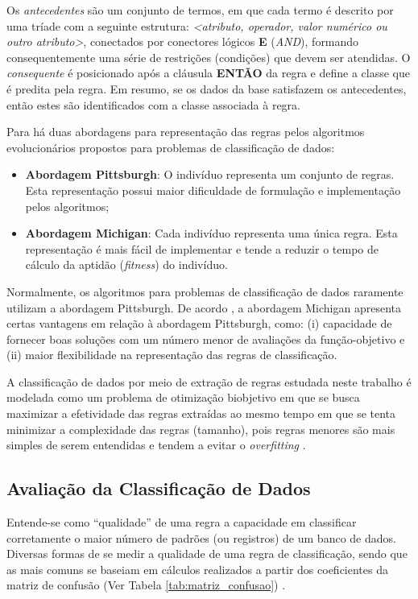 \documentclass[
	12pt,				%
	openany,			%
	oneside,	
	a4paper,			%
	brazil,				%
	]{unimontes-ppgmsc-abntex2}
\begin{document}
Os {\em antecedentes} são um conjunto de termos, em que cada termo é descrito por uma tríade com a seguinte estrutura: \textit{<atributo, operador, valor numérico ou outro atributo>}, conectados por conectores lógicos \textbf{E} ({\em AND}), formando consequentemente uma série de restrições (condições) que devem ser atendidas. O {\em consequente} é posicionado após a cláusula \textbf{ENTÃO} da regra e define a classe que é predita pela regra. Em resumo, se os dados da base satisfazem os antecedentes, então estes são identificados com a classe associada à regra.

Para  há duas abordagens para representação das regras pelos algoritmos evolucionários propostos para problemas de classificação de dados:
 
\begin{itemize}
\item \textbf{Abordagem Pittsburgh}: O indivíduo representa um conjunto de regras. Esta representação possui maior dificuldade de formulação e implementação pelos algoritmos;
\item \textbf{Abordagem Michigan}: Cada indivíduo representa uma única regra. Esta representação é mais fácil de implementar e tende a reduzir o tempo de cálculo da aptidão ({\em fitness}) do indivíduo.
\end{itemize}

Normalmente, os algoritmos para problemas de classificação de dados raramente utilizam a abordagem Pittsburgh. De acordo , a abordagem Michigan apresenta certas vantagens em relação à abordagem Pittsburgh, como: (i) capacidade de fornecer boas soluções com um número menor de avaliações da função-objetivo e (ii) maior flexibilidade na representação das regras de classificação.

A classificação de dados por meio de extração de regras estudada neste trabalho é modelada como um problema de otimização biobjetivo em que se busca maximizar a efetividade das regras extraídas ao mesmo tempo em que se tenta minimizar a complexidade das regras (tamanho), pois regras menores são mais simples de serem entendidas e tendem a evitar o {\em overfitting} \cite{Pereira_2012}.

\subsection{Avaliação da Classificação de Dados}
\label{sec:aval_fit}

Entende-se como ``qualidade'' de uma regra a capacidade em classificar corretamente o maior número de padrões (ou registros) de um banco de dados. Diversas formas de se medir a qualidade de uma regra de classificação, sendo que as mais comuns se baseiam em cálculos realizados a partir dos coeficientes da matriz de confusão (Ver Tabela \ref{tab:matriz_confusao}) \cite{Pereira_2012}.
\end{document}
